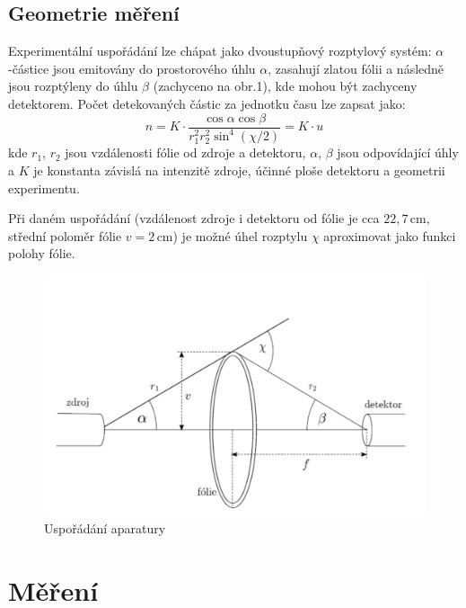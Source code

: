 \documentclass[czech,11pt,a4paper]{article}
\begin{document}
\begin{multicols}{2}
		\subsection*{Geometrie měření}
		
		Experimentální uspořádání lze chápat jako dvoustupňový rozptylový systém: $\alpha$-částice jsou emitovány do prostorového úhlu $\alpha$, zasahují zlatou fólii a následně jsou rozptýleny do úhlu $\beta$ (zachyceno na obr.1), kde mohou být zachyceny detektorem. Počet detekovaných částic za jednotku času lze zapsat jako:
		\begin{equation}
			n = K \cdot \frac{\cos\alpha \cos\beta}{r_1^2 r_2^2 \sin^4(\chi / 2)} = K\cdot u
		\end{equation}
		kde $r_1$, $r_2$ jsou vzdálenosti fólie od zdroje a detektoru, $\alpha$, $\beta$ jsou odpovídající úhly a $K$ je konstanta závislá na intenzitě zdroje, účinné ploše detektoru a geometrii experimentu.
		
		Při daném uspořádání (vzdálenost zdroje i detektoru od fólie je cca $22{,}7\,\mathrm{cm}$, střední poloměr fólie $v = 2\,\mathrm{cm}$) je možné úhel rozptylu $\chi$ aproximovat jako funkci polohy fólie.
		\begin{figure}[H]
			\centering
			\includegraphics[width=0.9\linewidth]{fig1}
			\caption{Uspořádání aparatury}
			
		\end{figure}
		
		\section{Měření}
		

\end{multicols}
\end{document}

